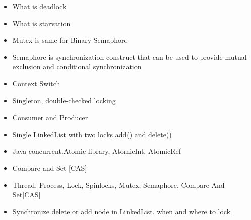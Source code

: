 \documentclass{article}
\begin{document}
\begin{enumerate}
\begin{itemize}
 \item What is deadlock 
 \item What is starvation 
 \item Mutex is same for Binary Semaphore 
 \item Semaphore is synchronization construct that can be used to provide
       mutual exclusion and conditional synchronization
 \item Context Switch
 \item Singleton, double-checked locking 
 \item Consumer and Producer
 \item Single LinkedList with two locks add() and delete() 
 \item Java concurrent.Atomic library, AtomicInt, AtomicRef 
 \item Compare and Set [CAS]
 \item Thread, Process, Lock, Spinlocks, Mutex, Semaphore, Compare And Set[CAS]
 \item Synchronize delete or add node in LinkedList. when and where to lock
\end{itemize}

\end{enumerate}
\end{document}
